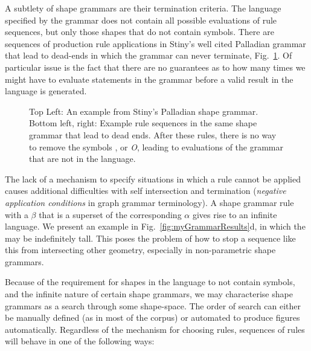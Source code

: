 


A subtlety of shape grammars are their termination criteria. The language specified by the grammar does not contain all possible evaluations of rule sequences, but only those shapes that do not contain symbols. There are sequences of production rule applications in Stiny's well cited Palladian grammar\cite{Stiny78} that lead to dead-ends in which the grammar can never terminate, Fig.~\ref{brokenPalladian}. Of particular issue is the fact that there are no guarantees as to how many times we might have to evaluate statements in the grammar before a valid result in the language is generated.

\begin{figure}
\centering
\def\svgwidth{0.8\columnwidth}

\caption[Dead ends in the Palladian grammar]{\label{fig:palladianGrammar}Top Left: An example from Stiny's Palladian shape grammar\cite{Stiny78}. Bottom left, right: Example rule sequences in the same shape grammar that lead to dead ends. After these rules, there is no way to remove the symbols \textbullet, or \emph{O}, leading to evaluations of the grammar that are not in the language.}
\label{brokenPalladian}
\end{figure}

The lack of a mechanism to specify situations in which a rule cannot be applied causes additional difficulties with self intersection and termination (\emph{negative application conditions} in graph grammar terminology). A shape grammar rule with a $\beta$ that is a superset of the corresponding $\alpha$ gives rise to an infinite language. We present an example in Fig.~\ref{fig:myGrammarResults}d, in which the \facade{} may be indefinitely tall. This poses the problem of how to stop a sequence like this from intersecting other geometry, especially in non-parametric shape grammars.

Because of the requirement for shapes in the language to not contain symbols, and the infinite nature of certain shape grammars, we may characterise shape grammars as a search through some shape-space. The order of search can either be manually defined (as in most of the corpus) or automated to produce figures automatically\cite{Grasl10}. Regardless of the mechanism for choosing rules, sequences of rules will behave in one of the following ways:

